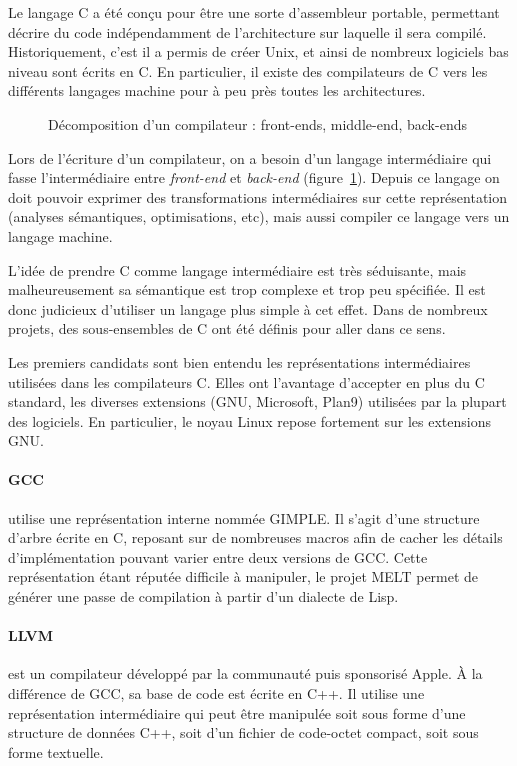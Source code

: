 Le langage C \cite{KandR,AnsiC} a été conçu pour être une sorte d'assembleur
portable, permettant décrire du code indépendamment de l'architecture sur
laquelle il sera compilé. Historiquement, c'est il a permis de créer Unix, et
ainsi de nombreux logiciels bas niveau sont écrits en C. En particulier, il
existe des compilateurs de C vers les différents langages machine pour à peu
près toutes les architectures.

\begin{figure}
  \centering

  

  \caption{Décomposition d'un compilateur : front-ends, middle-end, back-ends}
  \label{fig:middle-end}
\end{figure}

Lors de l'écriture d'un compilateur, on a besoin d'un langage intermédiaire qui
fasse l'intermédiaire entre \emph{front-end} et \emph{back-end}
(figure~\ref{fig:middle-end}). Depuis ce langage on doit pouvoir exprimer des
transformations intermédiaires sur cette représentation (analyses sémantiques,
optimisations, etc), mais aussi compiler ce langage vers un langage machine.

L'idée de prendre C comme langage intermédiaire est très séduisante, mais
malheureusement sa sémantique est trop complexe et trop peu spécifiée. Il est
donc judicieux d'utiliser un langage plus simple à cet effet. Dans de nombreux
projets, des sous-ensembles de C ont été définis pour aller dans ce sens.

Les premiers candidats sont bien entendu les représentations intermédiaires
utilisées dans les compilateurs C. Elles ont l'avantage d'accepter en plus du C
standard, les diverses extensions (GNU, Microsoft, Plan9) utilisées par la
plupart des logiciels. En particulier, le noyau Linux repose fortement sur les
extensions GNU.

\paragraph{GCC} utilise une représentation interne nommée
GIMPLE\cite{gcc-gimple}. Il s'agit d'une structure d'arbre écrite en C, reposant
sur de nombreuses macros afin de cacher les détails d'implémentation pouvant
varier entre deux versions de GCC. Cette représentation étant réputée difficile
à manipuler, le projet MELT\cite{gcc-melt} permet de générer une passe de
compilation à partir d'un dialecte de Lisp.

\paragraph{LLVM}\cite{llvm-pres} est un compilateur développé par la communauté
puis sponsorisé Apple. À la différence de GCC, sa base de code est écrite en
C++. Il utilise une représentation intermédiaire qui peut être manipulée soit
sous forme d'une structure de données C++, soit d'un fichier de code-octet
compact, soit sous forme textuelle.


